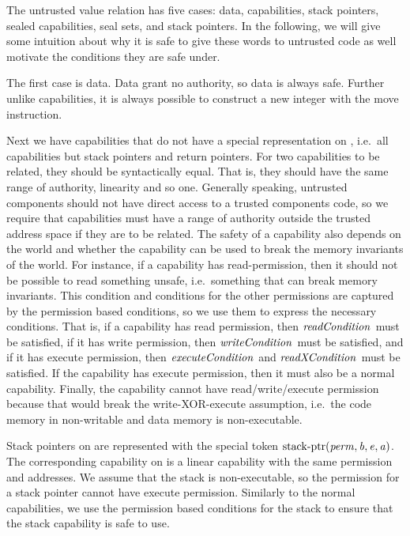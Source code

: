 \begin{jversion}
The untrusted value relation has five cases: data, capabilities, stack pointers, sealed capabilities, seal sets, and stack pointers.
In the following, we will give some intuition about why it is safe to give these words to untrusted code as well motivate the conditions they are safe under.

The first case is data.
Data grant no authority, so data is always safe.
Further unlike capabilities, it is always possible to construct a new integer with the move instruction.

Next we have capabilities that do not have a special representation on \srccm{}, i.e.\ all capabilities but stack pointers and return pointers.
For two capabilities to be related, they should be syntactically equal.
That is, they should have the same range of authority, linearity and so one.
Generally speaking, untrusted components should not have direct access to a trusted components code, so we require that capabilities must have a range of authority outside the trusted address space if they are to be related.
The safety of a capability also depends on the world and whether the capability can be used to break the memory invariants of the world.
For instance, if a capability has read-permission, then it should not be possible to read something unsafe, i.e.\ something that can break memory invariants.
This condition and conditions for the other permissions are captured by the permission based conditions, so we use them to express the necessary conditions.
That is, if a capability has read permission, then $\readCond[]{}$ must be satisfied, if it has write permission, then $\writeCond[]{}$ must be satisfied, and if it has execute permission, then $\execCond[]{}$ and $\xReadCond[]{}$ must be satisfied.
If the capability has execute permission, then it must also be a normal capability.
Finally, the capability cannot have read/write/execute permission because that would break the write-XOR-execute assumption, i.e.\ the code memory in non-writable and data memory is non-executable.

Stack pointers on \srccm{} are represented with the special token $\mathrm{stack\text{-}ptr}(\mathit{perm},\mathit{b},\mathit{e},\mathit{a})$.
The corresponding capability on \trgcm{} is a linear capability with the same permission and addresses.
We assume that the stack is non-executable, so the permission for a stack pointer cannot have execute permission.
Similarly to the normal capabilities, we use the permission based conditions for the stack to ensure that the stack capability is safe to use.


\end{jversion}
